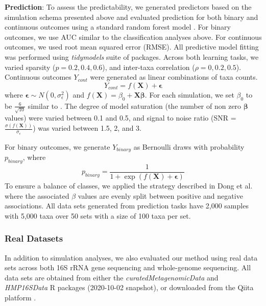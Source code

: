 \documentclass[10pt,letterpaper]{article}
\begin{document}
\noindent \textbf{Prediction}: To assess the predictability, we generated predictors based on the simulation schema presented above and evaluated prediction for both binary and continuous outcomes using a standard random forest model \cite{breiman2001}. For binary outcomes, we use AUC similar to the classification analyses above. For continuous outcomes, we used root mean squared error (RMSE). All predictive model fitting was performed using \emph{tidymodels} \cite{kuhn2020} suite of packages. Across both learning tasks, we varied sparsity ($p = 0.2, 0.4, 0.6$), and inter-taxa correlation ($\rho = 0, 0.2, 0.5$). Continuous outcomes $Y_{cont}$ were generated as linear combinations of taxa counts.  
\begin{equation}
    Y_{cont} = f(\mathbf{X}) + \mathbf{\epsilon}
\end{equation}
where $\mathbf{\epsilon} \sim N(0, \sigma_{\epsilon}^2)$ and $f(\mathbf{X}) = \beta_0 + \mathbf{X}\mathbf{\beta}$. For each simulation, we set $\beta_0$ to be $\frac{6}{\sqrt{10}}$ similar to \cite{xiao2018}. The degree of model saturation (the number of non zero $\mathbf{\beta}$ values) were varied between 0.1 and 0.5, and signal to noise ratio (SNR = $\frac{\sigma(f(\mathbf{X}))}{\sigma_{\epsilon}}$) was varied between 1.5, 2, and 3. 

For binary outcomes, we generate $Y_{binary}$ as Bernoulli draws with probability $p_{binary}$, where 
$$p_{binary} = \frac{1}{1 + \exp(f(\mathbf{X}) + \mathbf{\epsilon})}$$
To ensure a balance of classes, we applied the strategy described in Dong et al. \cite{dong2020} where the associated $\beta$ values are evenly split between positive and negative associations. All data sets generated from prediction tasks have 2,000 samples with 5,000 taxa over 50 sets with a size of 100 taxa per set.  

\subsubsection*{Real Datasets}

In addition to simulation analyses, we also evaluated our method using real data sets across both 16S rRNA gene sequencing and whole-genome sequencing. All data sets are obtained from either the \emph{curatedMetagenomicData} \cite{pasolli2017} and \emph{HMP16SData} \cite{schiffer2019} R packages (2020-10-02 snapshot), or downloaded from the Qiita platform \cite{gonzalez2018}.  
\end{document}
